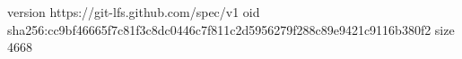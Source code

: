 version https://git-lfs.github.com/spec/v1
oid sha256:cc9bf46665f7c81f3c8dc0446c7f811c2d5956279f288c89e9421c9116b380f2
size 4668
